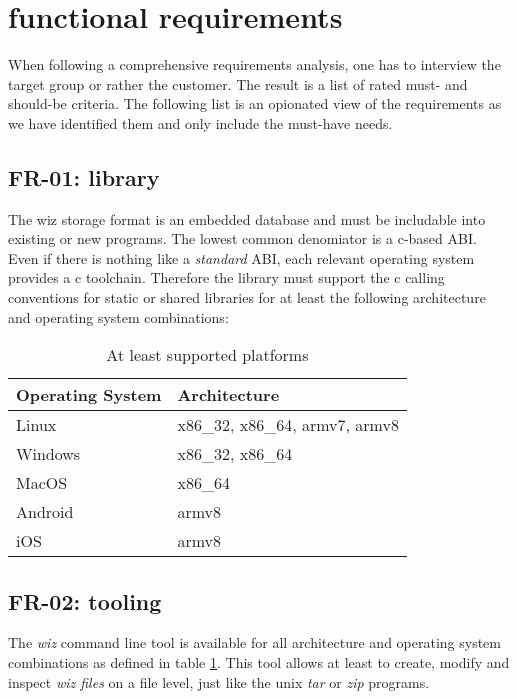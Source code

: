 \documentclass[9pt,pagesize,DIV12,normalheadings,BCOR5mm,headexclude,footexclude]{scrbook}
\begin{document}
\section{functional requirements}
When following a comprehensive requirements analysis, one has to interview
the target group or rather the customer. The result is a list of rated
must- and should-be criteria. The following list is an opionated view of the
requirements as we have identified them and only include the must-have needs.

\subsection{FR-01: library}
The wiz storage format is an embedded database and must be includable into 
existing or new programs. The lowest common denomiator is a c-based ABI.
Even if there is nothing like a \textit{standard} ABI, each relevant 
operating system provides a c toolchain. Therefore the library must support
the c calling conventions for static or shared libraries for at least
the following architecture and operating system combinations:

\begin{table}[htp]
    \centering
    \begin{tabular}{l|l}
    \textbf{Operating System} & \textbf{Architecture}          \\ \hline
    Linux                     & x86\_32, x86\_64, armv7, armv8 \\ \hline
    Windows                   & x86\_32, x86\_64               \\ \hline
    MacOS                     & x86\_64                        \\ \hline
    Android                   & armv8                          \\ \hline
    iOS                       & armv8                         
    \end{tabular}
    \caption{At least supported platforms}
    \label{table:targets}
\end{table}

\subsection{FR-02: tooling}
The \textit{wiz} command line tool is available for all 
architecture and operating system combinations as defined 
in table \ref{table:targets}. This tool allows at least to create, 
modify and inspect \textit{wiz files} on a file
level, just like the unix \textit{tar} or \textit{zip} programs.
\end{document}
